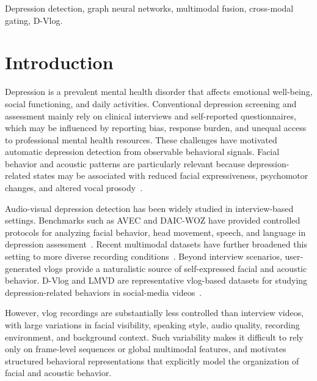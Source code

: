 \documentclass[conference]{IEEEtran}
\begin{document}
\begin{IEEEkeywords}
Depression detection, graph neural networks, multimodal fusion, cross-modal gating, D-Vlog.
\end{IEEEkeywords}

\section{Introduction}
\label{sec:intro}
Depression is a prevalent mental health disorder that affects emotional well-being, social functioning, and daily activities. Conventional depression screening and assessment mainly rely on clinical interviews and self-reported questionnaires, which may be influenced by reporting bias, response burden, and unequal access to professional mental health resources. These challenges have motivated automatic depression detection from observable behavioral signals. Facial behavior and acoustic patterns are particularly relevant because depression-related states may be associated with reduced facial expressiveness, psychomotor changes, and altered vocal prosody~\cite{cohn2009detecting,cummins2015review,yang2013vocal}. 

Audio-visual depression detection has been widely studied in interview-based settings. Benchmarks such as AVEC and DAIC-WOZ have provided controlled protocols for analyzing facial behavior, head movement, speech, and language in depression assessment~\cite{valstar2014avec,gratch2014daic,ringeval2017avec}. Recent multimodal datasets have further broadened this setting to more diverse recording conditions~\cite{zou2023cmdc,uddin2023deep}. Beyond interview scenarios, user-generated vlogs provide a naturalistic source of self-expressed facial and acoustic behavior. D-Vlog and LMVD are representative vlog-based datasets for studying depression-related behaviors in social-media videos~\cite{yoon2022dvlog,he2024lmvd}.

However, vlog recordings are substantially less controlled than interview videos, with large variations in facial visibility, speaking style, audio quality, recording environment, and background context. Such variability makes it difficult to rely only on frame-level sequences or global multimodal features, and motivates structured behavioral representations that explicitly model the organization of facial and acoustic behavior.
\end{document}
